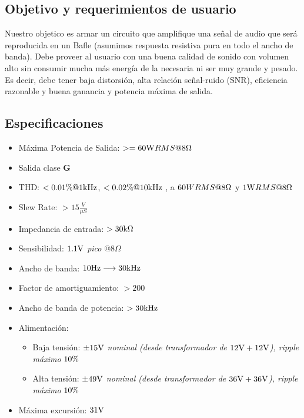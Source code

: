 \subsection{Objetivo y requerimientos de usuario}

Nuestro objetico es armar un circuito que amplifique una señal de audio que será reproducida en un Bafle (asumimos respuesta resistiva pura en todo el ancho de banda).  Debe proveer al usuario con una buena calidad de sonido con volumen alto sin consumir mucha más energía de la necesaria ni ser muy grande y pesado. Es decir, debe tener baja distorsión, alta relación señal-ruido (SNR), eficiencia razonable y buena ganancia y potencia máxima de salida.



\subsection{Especificaciones}

\bigskip

\begin{itemize}
	\item Máxima Potencia de Salida:  $>= 60\si[per-mode=symbol]{\watt} RMS @8\si[per-mode=symbol]{\ohm}$
	\item Salida clase \textbf{G}
	\item THD: $< 0.01 \si[per-mode=symbol]{\percent} @ 1\si[per-mode=symbol]{\kilo\hertz}$, $<0.02 \si[per-mode=symbol]{\percent} @ 10\si[per-mode=symbol]{\kilo\hertz}$ , a $60W RMS@8\si[per-mode=symbol]{\ohm}$ y $1\si[per-mode=symbol]{\watt} RMS @8 \si[per-mode=symbol]{\ohm}$
	\item Slew Rate: $>15\frac{V}{\mu S}$
	\item Impedancia de entrada: $>30\si[per-mode=symbol]{\kilo\ohm}$
	\item Sensibilidad: $1.1\si[per-mode=symbol]{\volt}$ \textit{pico} $@8\Omega$
	\item Ancho de banda: $10\si[per-mode=symbol]{\hertz} \longrightarrow  30\si[per-mode=symbol]{\kilo\hertz}$
	\item Factor de amortiguamiento: $>200$
	\item Ancho de banda de potencia: $>30\si[per-mode=symbol]{\kilo\hertz}$
	\item Alimentación: 
	\begin{itemize}
		\item Baja tensión: $ \pm 15\si[per-mode=symbol]{\volt}$ \textit{nominal (desde transformador de $ 12 \si[per-mode=symbol]{\volt} +12 \si[per-mode=symbol]{\volt}$), ripple máximo} $10 \si[per-mode=symbol]{\percent}$
		\item Alta tensión: $ \pm 49\si[per-mode=symbol]{\volt}$ \textit{nominal (desde transformador de $ 36 \si[per-mode=symbol]{\volt} +36 \si[per-mode=symbol]{\volt}$), ripple máximo} $10 \si[per-mode=symbol]{\percent}$
	\end{itemize}
	
	\item Máxima excursión: $31\si[per-mode=symbol]{\volt}$
\end{itemize}




